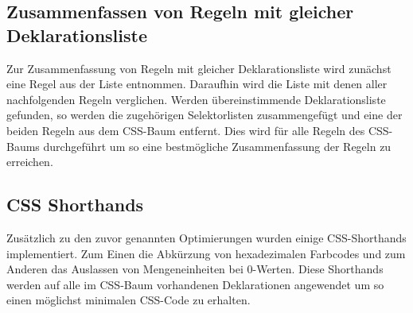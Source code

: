 \subsection{Zusammenfassen von Regeln mit gleicher Deklarationsliste}
Zur Zusammenfassung von Regeln mit gleicher Deklarationsliste wird zunächst eine Regel aus der Liste entnommen. Daraufhin wird die Liste mit denen aller nachfolgenden Regeln verglichen. Werden übereinstimmende Deklarationsliste gefunden, so werden die zugehörigen Selektorlisten zusammengefügt und eine der beiden Regeln aus dem CSS-Baum entfernt.
Dies wird für alle Regeln des CSS-Baums durchgeführt um so eine bestmögliche Zusammenfassung der Regeln zu erreichen.

\subsection{CSS Shorthands}
Zusätzlich zu den zuvor genannten Optimierungen wurden einige CSS-Shorthands implementiert. Zum Einen die Abkürzung von hexadezimalen Farbcodes und zum Anderen das Auslassen von Mengeneinheiten bei 0-Werten.
Diese Shorthands werden auf alle im CSS-Baum vorhandenen Deklarationen angewendet um so einen möglichst minimalen CSS-Code zu erhalten.

